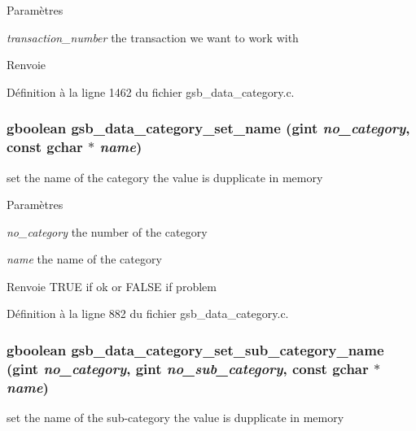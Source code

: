 \begin{DoxyParams}{Paramètres}
\item[{\em transaction\_\-number}]the transaction we want to work with\end{DoxyParams}
\begin{DoxyReturn}{Renvoie}

\end{DoxyReturn}


Définition à la ligne 1462 du fichier gsb\_\-data\_\-category.c.

\subsubsection[{gsb\_\-data\_\-category\_\-set\_\-name}]{\setlength{\rightskip}{0pt plus 5cm}gboolean gsb\_\-data\_\-category\_\-set\_\-name (gint {\em no\_\-category}, \/  const gchar $\ast$ {\em name})}\label{gsb__data__category_8c_a24478d49cde92d7c4b165bd5a746aa6a}
set the name of the category the value is dupplicate in memory


\begin{DoxyParams}{Paramètres}
\item[{\em no\_\-category}]the number of the category \item[{\em name}]the name of the category\end{DoxyParams}
\begin{DoxyReturn}{Renvoie}
TRUE if ok or FALSE if problem 
\end{DoxyReturn}


Définition à la ligne 882 du fichier gsb\_\-data\_\-category.c.

\subsubsection[{gsb\_\-data\_\-category\_\-set\_\-sub\_\-category\_\-name}]{\setlength{\rightskip}{0pt plus 5cm}gboolean gsb\_\-data\_\-category\_\-set\_\-sub\_\-category\_\-name (gint {\em no\_\-category}, \/  gint {\em no\_\-sub\_\-category}, \/  const gchar $\ast$ {\em name})}\label{gsb__data__category_8c_aa34eb73fc8d399e770bfaf0e9dbae579}
set the name of the sub-\/category the value is dupplicate in memory


